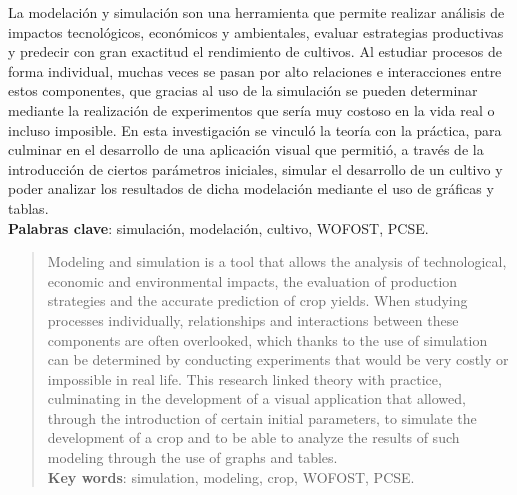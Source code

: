 \begin{resumen}
	La modelación y simulación son una herramienta que permite realizar análisis de impactos tecnológicos, económicos y ambientales, evaluar estrategias productivas y predecir con gran exactitud el rendimiento de cultivos. Al estudiar procesos de forma individual, muchas veces se pasan por alto relaciones e interacciones entre estos componentes, que gracias al uso de la simulación se pueden determinar mediante la realización de experimentos que sería muy costoso en la vida real o incluso imposible. En esta investigación se vinculó la teoría con la práctica, para culminar en el desarrollo de una aplicación visual que permitió, a través de la introducción de ciertos parámetros iniciales, simular el desarrollo de un cultivo y poder analizar los resultados de dicha modelación mediante el uso de gráficas y tablas.\\
	
	\textbf{Palabras clave}: simulación, modelación, cultivo, WOFOST, PCSE.
\end{resumen}

\begin{abstract}
	Modeling and simulation is a tool that allows the analysis of technological, economic and environmental impacts, the evaluation of production strategies and the accurate prediction of crop yields. When studying processes individually, relationships and interactions between these components are often overlooked, which thanks to the use of simulation can be determined by conducting experiments that would be very costly or impossible in real life. This research linked theory with practice, culminating in the development of a visual application that allowed, through the introduction of certain initial parameters, to simulate the development of a crop and to be able to analyze the results of such modeling through the use of graphs and tables.\\
	
	\textbf{Key words}: simulation, modeling, crop, WOFOST, PCSE.
\end{abstract}